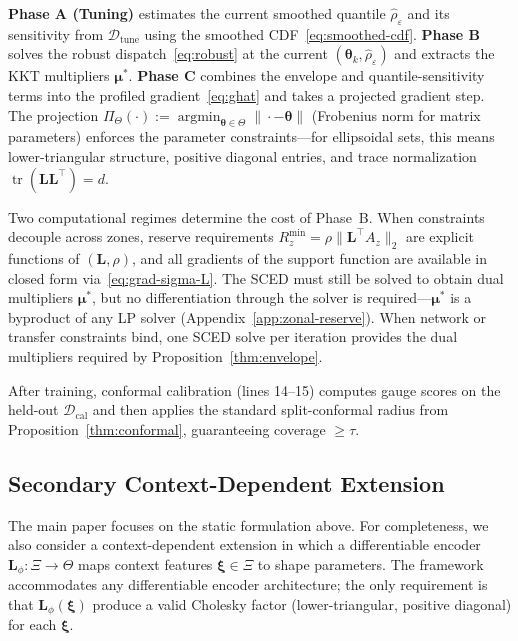 \documentclass[11pt]{article}
\newcommand{\cD}{\mathcal{D}}
\newcommand{\btheta}{\bm{\theta}}
\newcommand{\bmu}{\bm{\mu}}
\newcommand{\bxi}{\bm{\xi}}
\newcommand{\bL}{\bm{L}}
\DeclareMathOperator{\argmin}{argmin}
\DeclareMathOperator{\tr}{tr}
\theoremstyle{definition}
\begin{document}
\textbf{Phase A (Tuning)} estimates the current smoothed quantile $\hat{\rho}_\varepsilon$ and its sensitivity from $\cD_{\text{tune}}$ using the smoothed CDF~\eqref{eq:smoothed-cdf}. \textbf{Phase B} solves the robust dispatch~\eqref{eq:robust} at the current $(\btheta_k, \hat{\rho}_\varepsilon)$ and extracts the KKT multipliers $\bmu^*$. \textbf{Phase C} combines the envelope and quantile-sensitivity terms into the profiled gradient~\eqref{eq:ghat} and takes a projected gradient step. The projection $\Pi_\Theta(\cdot):=\argmin_{\btheta\in\Theta}\|\cdot-\btheta\|$ (Frobenius norm for matrix parameters) enforces the parameter constraints---for ellipsoidal sets, this means lower-triangular structure, positive diagonal entries, and trace normalization $\tr(\bL\bL^\top) = d$.

Two computational regimes determine the cost of Phase~B. When constraints decouple across zones, reserve requirements $R_z^{\min} = \rho\|\bL^\top A_z\|_2$ are explicit functions of $(\bL,\rho)$, and all gradients of the support function are available in closed form via~\eqref{eq:grad-sigma-L}. The SCED must still be solved to obtain dual multipliers $\bmu^*$, but no differentiation through the solver is required---$\bmu^*$ is a byproduct of any LP solver (Appendix~\ref{app:zonal-reserve}). When network or transfer constraints bind, one SCED solve per iteration provides the dual multipliers required by Proposition~\ref{thm:envelope}.

After training, conformal calibration (lines 14--15) computes gauge scores on the held-out $\cD_{\text{cal}}$ and then applies the standard split-conformal radius from Proposition~\ref{thm:conformal}, guaranteeing coverage $\geq \tau$.

\subsection{Secondary Context-Dependent Extension}

The main paper focuses on the static formulation above. For completeness, we also consider a context-dependent extension in which a differentiable encoder $\bL_\phi: \Xi \to \Theta$ maps context features $\bxi \in \Xi$ to shape parameters. The framework accommodates any differentiable encoder architecture; the only requirement is that $\bL_\phi(\bxi)$ produce a valid Cholesky factor (lower-triangular, positive diagonal) for each $\bxi$.
\end{document}
